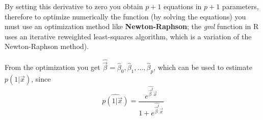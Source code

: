     By setting this derivative to zero you obtain $p+1$ equations in $p+1$ parameters, therefore to optimize numerically the function (by solving the equations) you must use an optimization method like \textbf{Newton-Raphson}; the \textit{gml} function in R uses an iterative reweighted least-squares algorithm, which is a variation of the Newton-Raphson method).

    From the optimization you get $\hat{\vec{\beta}} = \hat{\beta}_0, \hat{\beta}_1, \dots, \hat{\beta}_p $, which can be used to estimate $p(1|\vec{x})$, since
    $$\hat{p(1|\vec{x})} = \frac{e^{\hat{\vec{\beta}^t}\vec{x}}}{1+e^{\hat{\vec{\beta}^t}\vec{x}}}$$

